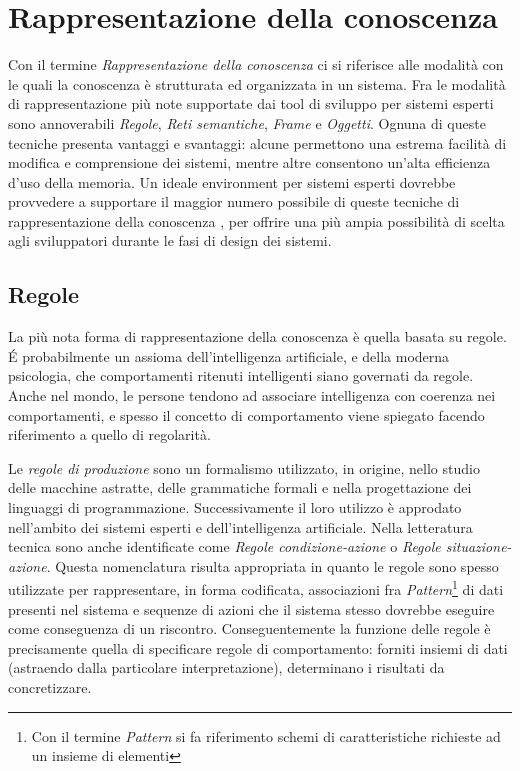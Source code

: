\section{Rappresentazione della conoscenza}
Con il termine \emph{Rappresentazione della conoscenza} ci si riferisce alle modalità con le quali la conoscenza è strutturata ed organizzata in un sistema. Fra le modalità di rappresentazione più note supportate dai tool di sviluppo per sistemi esperti sono annoverabili \emph{Regole}, \emph{Reti semantiche}, \emph{Frame} e \emph{Oggetti}. Ognuna di queste tecniche presenta vantaggi e svantaggi: alcune permettono una estrema facilità di modifica e comprensione dei sistemi, mentre altre consentono un'alta efficienza d'uso della memoria. Un ideale environment per sistemi esperti dovrebbe provvedere a supportare il maggior numero possibile di queste tecniche di rappresentazione della conoscenza \cite{development1993}, per offrire una più ampia possibilità di scelta agli sviluppatori durante le fasi di design dei sistemi.

\subsection{Regole}
La più nota forma di rappresentazione della conoscenza è quella basata su regole. \'E probabilmente un assioma dell'intelligenza artificiale, e della moderna psicologia, che comportamenti ritenuti intelligenti siano governati da regole. Anche nel mondo, le persone tendono ad associare intelligenza con coerenza nei comportamenti, e spesso il concetto di comportamento viene spiegato facendo riferimento a quello di regolarità. \cite{jackson1999}

Le \emph{regole di produzione} sono un formalismo utilizzato, in origine, nello studio delle macchine astratte, delle grammatiche formali e nella progettazione dei linguaggi di programmazione. Successivamente il loro utilizzo è approdato nell'ambito dei sistemi esperti e dell'intelligenza artificiale. Nella letteratura tecnica sono anche identificate come \emph{Regole condizione-azione} o \emph{Regole situazione-azione}. Questa nomenclatura risulta appropriata in quanto le regole sono spesso utilizzate per rappresentare, in forma codificata, associazioni fra \emph{Pattern}\footnote{Con il termine \emph{Pattern} si fa riferimento schemi di caratteristiche richieste ad un insieme di elementi} di dati presenti nel sistema e sequenze di azioni che il sistema stesso dovrebbe eseguire come conseguenza di un riscontro. Conseguentemente la funzione delle regole è precisamente quella di specificare regole di comportamento: forniti insiemi di dati (astraendo dalla particolare interpretazione), determinano i risultati da concretizzare.

